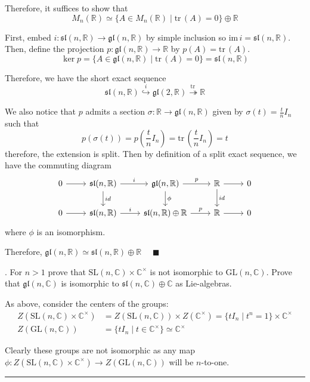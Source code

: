 \documentclass[12pt]{article}
\newcommand{\C}{\mathbb{C}}
\newcommand{\R}{\mathbb{R}}
\newcommand{\GL}{\text{GL}}
\newcommand{\SL}{\text{SL}}
\newcommand{\gl}{\mathfrak{gl}}
\newcommand{\sll}{\mathfrak{sl}}
\newcommand{\qed}{\quad \blacksquare}
\newcommand{\tr}{\text{tr}\,}
\begin{document}
        Therefore, it suffices to show that 
        \[M_n(\R) \simeq \{A \in M_n(\R) \; | \; \tr(A) = 0\} \oplus \R\]

        First, embed $i: \sll(n, \R) \to \gl(n, \R)$ by simple inclusion so $\text{im}\, i = \sll(n, \R)$. 
        Then, define the projection $p: \gl(n, \R) \to \R$ by $p(A) = \tr(A)$. 
        \[\ker p = \{A \in \gl(n, \R) \; | \; \tr(A) = 0\} = \sll(n, \R)\]
        
        Therefore, we have the short exact sequence 
        \[\sll(n, \R) \overset{i}{\hookrightarrow} \gl(2, \R) \overset{\tr}{\twoheadrightarrow} \R\]
        
        We also notice that $p$ admits a section $\sigma: \R \to \gl(n, \R)$ given by $\sigma(t) = \frac{t}{n}I_n$ such that 
        \[p(\sigma(t)) = p(\frac{t}{n}I_n) = \tr(\frac{t}{n}I_n) = t \]
        therefore, the extension is split. Then by definition of a split exact sequence, we have the commuting diagram 
        \[\begin{tikzcd}
            0 \arrow[r] & \sll(n, \R) \arrow[r, "i"] \arrow[d, "id"] & \gl(n, \R) \arrow[r, "p"] \arrow[d, "\phi"] & \R \arrow[r] \arrow[d, "id"] & 0\\
            0 \arrow[r] & \sll(n, \R) \arrow[r, "i"] & \sll(n, \R) \oplus \R \arrow[r, "p"] & \R \arrow[r] & 0
        \end{tikzcd}\]
        where $\phi$ is an isomorphism. 

        Therefore, $\gl(n,\R) \simeq \sll(n,\R)\oplus \R$ $\qed$
    
    \color{black}

.  For $n > 1$ prove that $\SL(n,\C) \times \C^{\times}$ is not isomorphic to $\GL(n,\C)$.  Prove that $\gl(n,\C)$ is isomorphic to $\sll(n,\C)\oplus \C$ as Lie-algebras. 

    \color{blue}
        As above, consider the centers of the groups:
        \begin{align*}
            Z(\SL(n, \C) \times \C^{\times}) &= Z(\SL(n, \C)) \times Z(\C^{\times}) = \{tI_n \; | \; t^n = 1\} \times \C^{\times}\\ 
            Z(\GL(n, \C)) &= \{tI_n \; | \; t \in \C^{\times}\} \simeq \C^{\times}
        \end{align*}

        Clearly these groups are not isomorphic as any map $\phi: Z(\SL(n, \C) \times \C^{\times}) \to Z(\GL(n, \C))$ will be $n$-to-one. 

        \vspace*{10pt}
        \hrule 
        \vspace*{10pt}
\end{document}
